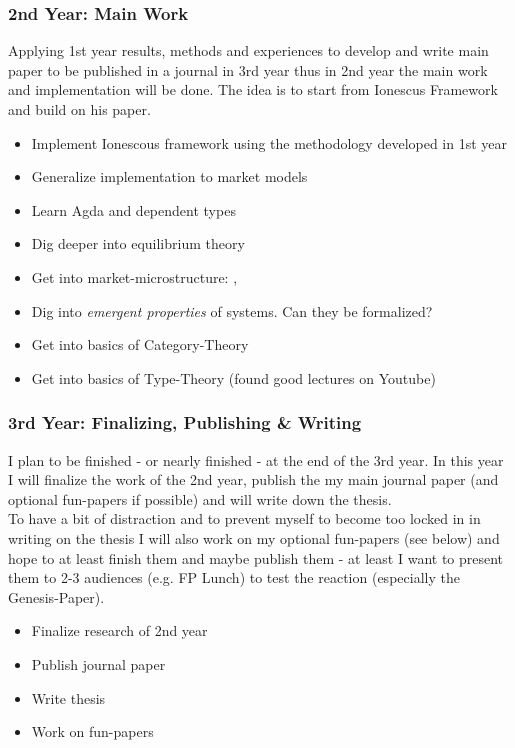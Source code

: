 \subsubsection{2nd Year: Main Work}
Applying 1st year results, methods and experiences to develop and write main paper to be published in a journal in 3rd year thus in 2nd year the main  work and implementation will be done. The idea is to start from Ionescus Framework \cite{Botta20114025} and build on his paper.

\begin{itemize}
\item Implement Ionescous framework using the methodology developed in 1st year
\item Generalize implementation to market models
\item Learn Agda and dependent types
\item Dig deeper into equilibrium theory 
\item Get into market-microstructure: \cite{LehalleLaruelle2013}, \cite{baker_market_2013}
\item Dig into \textit{emergent properties} of systems. Can they be formalized?
\item Get into basics of Category-Theory \cite{Pierce1991} \cite{spivak_category_2014}
\item Get into basics of Type-Theory (found good lectures on Youtube)

\end{itemize}

\subsubsection{3rd Year: Finalizing, Publishing \& Writing}
I plan to be finished - or nearly finished - at the end of the 3rd year. In this year I will finalize the work of the 2nd year, publish the my main journal paper (and optional fun-papers if possible) and will write down the thesis. \\ To have a bit of distraction and to prevent myself to become too locked in in writing on the thesis I will also work on my optional fun-papers (see below) and hope to at least finish them and maybe publish them - at least I want to present them to 2-3 audiences (e.g. FP Lunch) to test the reaction (especially the Genesis-Paper).

\begin{itemize}
\item Finalize research of 2nd year
\item Publish journal paper
\item Write thesis
\item Work on fun-papers
\end{itemize}

